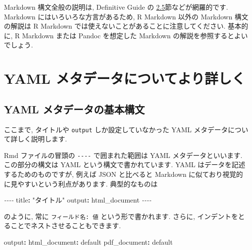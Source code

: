 \documentclass[
]{ltjsarticle}
\newenvironment{Shaded}{\begin{snugshade}}{\end{snugshade}}
\newcommand{\AttributeTok}[1]{\textcolor[rgb]{0.77,0.63,0.00}{#1}}
\newcommand{\FunctionTok}[1]{\textcolor[rgb]{0.00,0.00,0.00}{#1}}
\newcommand{\KeywordTok}[1]{\textcolor[rgb]{0.13,0.29,0.53}{\textbf{#1}}}
\newcommand{\PreprocessorTok}[1]{\textcolor[rgb]{0.56,0.35,0.01}{\textit{#1}}}
\newcommand{\StringTok}[1]{\textcolor[rgb]{0.31,0.60,0.02}{#1}}
\begin{document}
Markdown 構文全般の説明は, Definitive Guide の \href{https://bookdown.org/yihui/rmarkdown/markdown-syntax.html}{2.5}節などが網羅的です. Markdown にはいろいろな方言があるため, R Markdown 以外の Markdown 構文の解説は R Markdown では使えないことがあることに注意してください. 基本的に, R Markdown または Pandoc を想定した Markdown の解説を参照するとよいでしょう.

\hypertarget{YAML}{%
\section{YAML メタデータについてより詳しく}\label{YAML}}

\hypertarget{yaml-ux30e1ux30bfux30c7ux30fcux30bfux306eux57faux672cux69cbux6587}{%
\subsection{YAML メタデータの基本構文}\label{yaml-ux30e1ux30bfux30c7ux30fcux30bfux306eux57faux672cux69cbux6587}}

ここまで, タイトルや \texttt{output} しか設定していなかった YAML メタデータについて詳しく説明します.

Rmd ファイルの冒頭の \texttt{-\/-\/-\/-} で囲まれた範囲は YAML メタデータといいます. この部分の構文は YAML という構文で書かれています. YAML はデータを記述するためのものですが, 例えば JSON と比べると Markdown に似ており視覚的に見やすいという利点があります. 典型的なものは

\begin{Shaded}
\begin{Highlighting}[]
\PreprocessorTok{{-}{-}{-}{-}}
\FunctionTok{title}\KeywordTok{:}\AttributeTok{ }\StringTok{"タイトル"}
\FunctionTok{output}\KeywordTok{:}\AttributeTok{ html\_document}
\PreprocessorTok{{-}{-}{-}{-}}
\end{Highlighting}
\end{Shaded}

のように, 常に \texttt{フィールド名:\ 値} という形で書かれます. さらに, インデントをとることでネストさせることもできます.

\begin{Shaded}
\begin{Highlighting}[]
\FunctionTok{output}\KeywordTok{:}
\AttributeTok{  }\FunctionTok{html\_document}\KeywordTok{:}\AttributeTok{ default}
\AttributeTok{  }\FunctionTok{pdf\_document}\KeywordTok{:}\AttributeTok{ default}
\end{Highlighting}
\end{Shaded}
\end{document}
